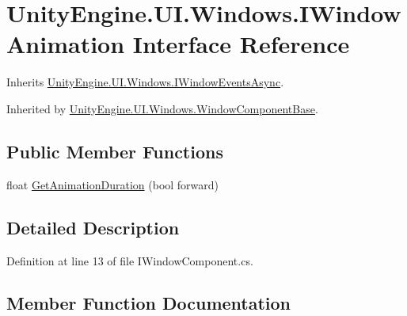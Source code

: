 \hypertarget{interface_unity_engine_1_1_u_i_1_1_windows_1_1_i_window_animation}{}\section{Unity\+Engine.\+U\+I.\+Windows.\+I\+Window\+Animation Interface Reference}
\label{interface_unity_engine_1_1_u_i_1_1_windows_1_1_i_window_animation}


Inherits \hyperlink{interface_unity_engine_1_1_u_i_1_1_windows_1_1_i_window_events_async}{Unity\+Engine.\+U\+I.\+Windows.\+I\+Window\+Events\+Async}.



Inherited by \hyperlink{class_unity_engine_1_1_u_i_1_1_windows_1_1_window_component_base}{Unity\+Engine.\+U\+I.\+Windows.\+Window\+Component\+Base}.

\subsection*{Public Member Functions}
\begin{DoxyCompactItemize}
\item 
float \hyperlink{interface_unity_engine_1_1_u_i_1_1_windows_1_1_i_window_animation_aa071e55fa2637c838a5155b5c751e9a4}{Get\+Animation\+Duration} (bool forward)
\end{DoxyCompactItemize}


\subsection{Detailed Description}


Definition at line 13 of file I\+Window\+Component.\+cs.



\subsection{Member Function Documentation}
\hypertarget{interface_unity_engine_1_1_u_i_1_1_windows_1_1_i_window_animation_aa071e55fa2637c838a5155b5c751e9a4}{}
